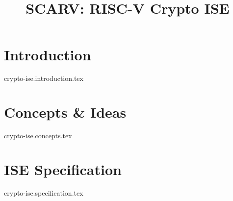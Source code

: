 \documentclass{article}
\title{SCARV: RISC-V Crypto ISE}
\begin{document}
\maketitle
\tableofcontents

\section{Introduction}
{crypto-ise.introduction.tex}

\section{Concepts \& Ideas}
{crypto-ise.concepts.tex}

\section{ISE Specification}
{crypto-ise.specification.tex}


\printbibliography
\end{document}
